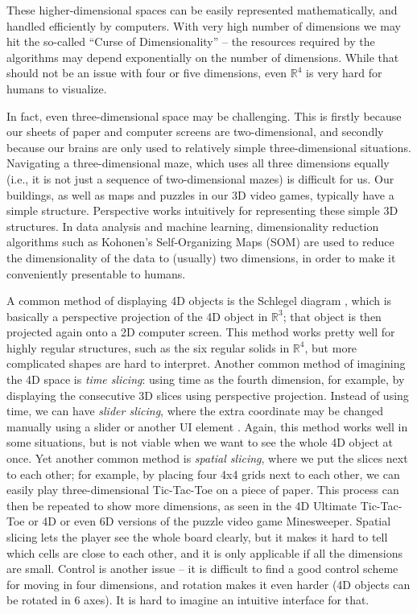 \documentclass{article}
\begin{document}
These higher-dimensional spaces can be easily represented
mathematically, and handled efficiently by computers. With 
very high number of dimensions we may hit the so-called ``Curse of
Dimensionality'' \cite{curse} -- the resources required by 
the algorithms may depend exponentially on the number of dimensions.
While that should not be an issue with four or five
dimensions, even $\mathbb{R}^4$ is very hard for
humans to visualize.

In fact, even three-dimensional space may be challenging. 
This is firstly because our sheets of paper and computer screens
are two-dimensional, and secondly because our brains are
only used to relatively simple three-dimensional situations.
Navigating a three-dimensional maze, which uses all three dimensions
equally (i.e., it is not just a sequence of two-dimensional mazes)
is difficult for us. Our buildings, as well as maps and puzzles in
our 3D video games, typically have a simple structure.
Perspective works intuitively for representing these simple 3D
structures. In data analysis and machine learning, dimensionality
reduction algorithms such as Kohonen's Self-Organizing Maps (SOM)
\cite{kohonen} are used to reduce the dimensionality of the data to (usually) two
dimensions, in order to make it conveniently presentable to humans.

A common method of displaying 4D objects is the
Schlegel diagram \cite{coxeter}, which is basically a perspective
projection of the 4D object in $\mathbb{R}^3$; that object is
then projected again onto a 2D computer screen. This method
works pretty well for highly regular structures, such as the six
regular solids in $\mathbb{R}^4$, but more complicated shapes are
hard to interpret. Another common method of imagining the 4D space
is {\it time slicing}: using time as the fourth dimension, for example, by displaying
the consecutive 3D slices using perspective projection. Instead of 
using time, we can have {\it slider slicing}, where the extra coordinate may be changed manually using a 
slider or another UI element \cite{4dtoys}. Again, this method works well in some
situations, but is not viable when we want to see the whole 4D object
at once. Yet another common method is {\it spatial slicing}, where we put the slices next to 
each other; for example, by placing four 4x4 grids next to each other,
we can easily play three-dimensional Tic-Tac-Toe \cite{tictac3} on a piece of paper.
This process can then be repeated to show more dimensions, as seen in the 4D Ultimate
Tic-Tac-Toe\cite{tictacultimate} or 4D or even 6D versions of the puzzle
video game Minesweeper. Spatial slicing lets the player see the whole board clearly, but it makes it hard to
tell which cells are close to each other, and it is only applicable 
if all the dimensions are small. Control is another issue -- it is difficult
to find a good control scheme for moving in four dimensions, and rotation makes it even
harder (4D objects can be rotated in 6 axes).
It is hard to imagine an intuitive interface for that.
\end{document}

